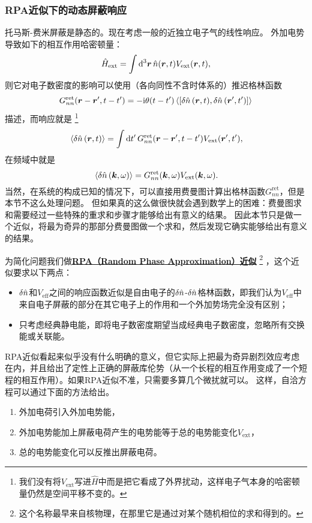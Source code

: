 \documentclass[hyperref, UTF8, a4paper]{ctexart}
\newcommand*{\ii}{\mathrm{i}}
\newcommand*{\concept}[1]{\underline{\textbf{#1}}}
\begin{document}
\subsubsection{RPA近似下的动态屏蔽响应}

托马斯-费米屏蔽是静态的。现在考虑一般的近独立电子气的线性响应。
外加电势导致如下的相互作用哈密顿量：
\[
    \hat{H}_\text{ext} = \int \dd[3]{\vb*{r}} \hat{n}(\vb*{r}, t) V_\text{ext} (\vb*{r}, t),
\]
则它对电子数密度的影响可以使用（各向同性不含时体系的）推迟格林函数
\[
    G^\text{ret}_{nn}(\vb*{r}-\vb*{r}', t-t') = - \ii \theta(t-t') \expval*{\comm{\var{\hat{n}}(\vb*{r}, t)}{\var{\hat{n}}(\vb*{r}', t')}}
\]
描述，而响应就是%
\footnote{我们没有将$V_\text{ext}$写进$\hat{H}$中而是把它看成了外界扰动，这样电子气本身的哈密顿量仍然是空间平移不变的。}%
\begin{equation}
    \expval*{\var{\hat{n}}(\vb*{r}, t)} = \int \dd{t'} G^\text{ret}_{nn}(\vb*{r}-\vb*{r}', t-t') V_\text{ext}(\vb*{r}', t'),
\end{equation}
在频域中就是
\begin{equation}
    \expval*{\var{\hat{n}}(\vb*{k}, \omega)} = G^\text{ret}_{nn}(\vb*{k}, \omega) V_\text{ext}(\vb*{k}, \omega).
    \label{eq:green-function-electro-shielding}
\end{equation}
当然，在系统的构成已知的情况下，可以直接用费曼图计算出格林函数$G^\text{ret}_{nn}$，但是本节不这么处理问题。
但如果真的这么做很快就会遇到数学上的困难：费曼图求和需要经过一些特殊的重求和步骤才能够给出有意义的结果。
因此本节只是做一个近似，将最为奇异的那部分费曼图做一个求和，然后发现它确实能够给出有意义的结果。

为简化问题我们做\concept{RPA（Random Phase Approximation）近似}%
\footnote{这个名称最早来自核物理，在那里它是通过对某个随机相位的求和得到的。}%
，这个近似要求以下两点：
\begin{itemize}
    \item $\var{\hat{n}}$和$V_\text{eff}$之间的响应函数近似是自由电子的$\var{\hat{n}}$-$\var{\hat{n}}$格林函数，即我们认为$V_\text{eff}$中来自电子屏蔽的部分在其它电子上的作用和一个外加势场完全没有区别；
    \item 只考虑经典静电能，即将电子数密度期望当成经典电子数密度，忽略所有交换能或关联能。
\end{itemize}
RPA近似看起来似乎没有什么明确的意义，但它实际上把最为奇异剧烈效应考虑在内，并且给出了定性上正确的屏蔽库伦势（从一个长程的相互作用变成了一个短程的相互作用）。如果RPA近似不准，只需要多算几个微扰就可以。
这样，自洽方程可以通过下面的方法给出。
\begin{enumerate}
    \item 外加电荷引入外加电势能，
    \item 外加电势能加上屏蔽电荷产生的电势能等于总的电势能变化$V_\text{ext}$，
    \item 总的电势能变化可以反推出屏蔽电荷。
\end{enumerate}
\end{document}
